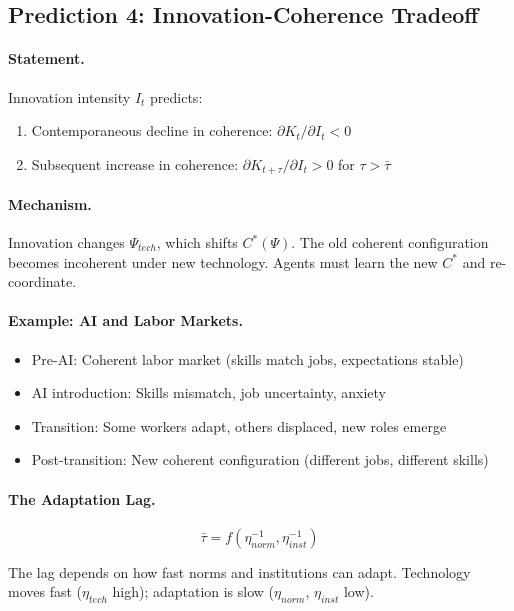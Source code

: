 \subsection{Prediction 4: Innovation-Coherence Tradeoff}

\paragraph{Statement.}
Innovation intensity $I_t$ predicts:
\begin{enumerate}
  \item[(a)] Contemporaneous decline in coherence: $\partial K_t / \partial I_t < 0$
  \item[(b)] Subsequent increase in coherence: $\partial K_{t+\tau} / \partial I_t > 0$ for $\tau > \bar{\tau}$
\end{enumerate}

\paragraph{Mechanism.}
Innovation changes $\Psi_{tech}$, which shifts $C^*(\Psi)$.
The old coherent configuration becomes incoherent under new technology.
Agents must learn the new $C^*$ and re-coordinate.

\paragraph{Example: AI and Labor Markets.}
\begin{itemize}
  \item Pre-AI: Coherent labor market (skills match jobs, expectations stable)
  \item AI introduction: Skills mismatch, job uncertainty, anxiety
  \item Transition: Some workers adapt, others displaced, new roles emerge
  \item Post-transition: New coherent configuration (different jobs, different skills)
\end{itemize}

\paragraph{The Adaptation Lag.}
\begin{equation}
  \bar{\tau} = f(\eta_{norm}^{-1}, \eta_{inst}^{-1})
\end{equation}

The lag depends on how fast norms and institutions can adapt.
Technology moves fast ($\eta_{tech}$ high);
adaptation is slow ($\eta_{norm}$, $\eta_{inst}$ low).

